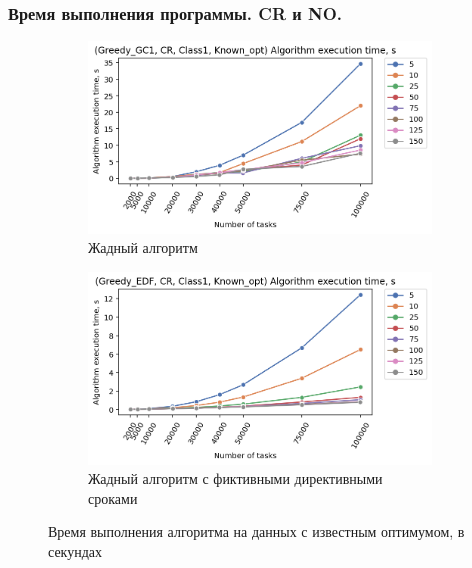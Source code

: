 \begin{frame}
    \frametitle{Время выполнения программы. CR и NO.}
    \begin{figure}
        \begin{subfigure}{0.49\textwidth}
            \includegraphics[width=\textwidth]{imgs/ideal_1/CR/tr_graph.png}
            \caption{Жадный алгоритм}
        \end{subfigure}
        \begin{subfigure}{0.49\textwidth}
            \includegraphics[width=\textwidth]{imgs/ideal_1/CR_EDF/tr_graph.png}
            \caption{Жадный алгоритм с фиктивными директивными сроками}
        \end{subfigure}
        \caption{Время выполнения алгоритма на данных с известным оптимумом, в секундах}
    \end{figure}
\end{frame}
